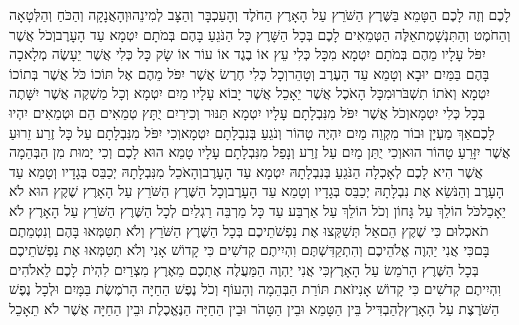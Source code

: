 \documentclass[../main/main.tex]{subfiles}
\begin{document}
\begin{multicols*}{\ncols}
לָכֶם \ClosedSection{}וְזֶה לָכֶם הַטָּמֵא בַּשֶּׁרֶץ הַשֹּׁרֵץ עַל הָאָרֶץ הַחֹלֶד וְהָעַכְבָּר וְהַצָּב לְמִינֵהוּ\PreVerseSpace{}וְהָאֲנָקָה וְהַכֹּחַ וְהַלְּטָאָה וְהַחֹמֶט וְהַתִּנְשָׁמֶת\PreVerseSpace{}אֵלֶּה הַטְּמֵאִים לָכֶם בְּכָל הַשָּׁרֶץ כָּל הַנֹּגֵעַ בָּהֶם בְּמֹתָם יִטְמָא עַד הָעָרֶב\PreVerseSpace{}וְכֹל אֲשֶׁר יִפֹּל עָלָיו מֵהֶם בְּמֹתָם יִטְמָא מִכָּל כְּלִי עֵץ אוֹ בֶגֶד אוֹ עוֹר אוֹ שָׂק כָּל כְּלִי אֲשֶׁר יֵעָשֶׂה מְלָאכָה בָּהֶם בַּמַּיִם יוּבָא וְטָמֵא עַד הָעֶרֶב וְטָהֵר\PreVerseSpace{}וְכָל כְּלִי חֶרֶשׂ אֲשֶׁר יִפֹּל מֵהֶם אֶל תּוֹכוֹ כֹּל אֲשֶׁר בְּתוֹכוֹ יִטְמָא וְאֹתוֹ תִשְׁבֹּרוּ\PreVerseSpace{}מִכָּל הָאֹכֶל אֲשֶׁר יֵאָכֵל אֲשֶׁר יָבוֹא עָלָיו מַיִם יִטְמָא וְכָל מַשְׁקֶה אֲשֶׁר יִשָּׁתֶה בְּכָל כְּלִי יִטְמָא\PreVerseSpace{}וְכֹל אֲשֶׁר יִפֹּל מִנִּבְלָתָם עָלָיו יִטְמָא תַּנּוּר וְכִירַיִם יֻתָּץ טְמֵאִים הֵם וּטְמֵאִים יִהְיוּ לָכֶם\PreVerseSpace{}אַךְ מַעְיָן וּבוֹר מִקְוֵה מַיִם יִהְיֶה טָהוֹר וְנֹגֵעַ בְּנִבְלָתָם יִטְמָא\PreVerseSpace{}וְכִי יִפֹּל מִנִּבְלָתָם עַל כָּל זֶרַע זֵרוּעַ אֲשֶׁר יִזָּרֵעַ טָהוֹר הוּא\PreVerseSpace{}וְכִי יֻתַּן מַיִם עַל זֶרַע וְנָפַל מִנִּבְלָתָם עָלָיו טָמֵא הוּא לָכֶם \ClosedSection{}וְכִי יָמוּת מִן הַבְּהֵמָה אֲשֶׁר הִיא לָכֶם לְאָכְלָה הַנֹּגֵעַ בְּנִבְלָתָהּ יִטְמָא עַד הָעָרֶב\PreVerseSpace{}וְהָאֹכֵל מִנִּבְלָתָהּ יְכַבֵּס בְּגָדָיו וְטָמֵא עַד הָעָרֶב וְהַנֹּשֵׂא אֶת נִבְלָתָהּ יְכַבֵּס בְּגָדָיו וְטָמֵא עַד הָעָרֶב\PreVerseSpace{}וְכָל הַשֶּׁרֶץ הַשֹּׁרֵץ עַל הָאָרֶץ שֶׁקֶץ הוּא לֹא יֵאָכֵל\PreVerseSpace{}כֹּל הוֹלֵךְ עַל גָּחוֹן וְכֹל הוֹלֵךְ עַל אַרְבַּע עַד כָּל מַרְבֵּה רַגְלַיִם לְכָל הַשֶּׁרֶץ הַשֹּׁרֵץ עַל הָאָרֶץ לֹא תֹאכְלוּם כִּי שֶׁקֶץ הֵם\PreVerseSpace{}אַל תְּשַׁקְּצוּ אֶת נַפְשֹׁתֵיכֶם בְּכָל הַשֶּׁרֶץ הַשֹּׁרֵץ וְלֹא תִטַּמְּאוּ בָּהֶם וְנִטְמֵתֶם בָּם\PreVerseSpace{}כִּי אֲנִי יַהְוֶה אֱלֹהֵיכֶם וְהִתְקַדִּשְׁתֶּם וִהְיִיתֶם קְדֹשִׁים כִּי קָדוֹשׁ אָנִי וְלֹא תְטַמְּאוּ אֶת נַפְשֹׁתֵיכֶם בְּכָל הַשֶּׁרֶץ הָרֹמֵשׂ עַל הָאָרֶץ\PreVerseSpace{}כִּי אֲנִי יַהְוֶה הַמַּעֲלֶה אֶתְכֶם מֵאֶרֶץ מִצְרַיִם לִהְיֹת לָכֶם לֵאלֹהִים וִהְיִיתֶם קְדֹשִׁים כִּי קָדוֹשׁ אָנִי\PreVerseSpace{}זֹאת תּוֹרַת הַבְּהֵמָה וְהָעוֹף וְכֹל נֶפֶשׁ הַחַיָּה הָרֹמֶשֶׂת בַּמָּיִם וּלְכָל נֶפֶשׁ הַשֹּׁרֶצֶת עַל הָאָרֶץ\PreVerseSpace{}לְהַבְדִּיל בֵּין הַטָּמֵא וּבֵין הַטָּהֹר וּבֵין הַחַיָּה הַנֶּאֱכֶלֶת וּבֵין הַחַיָּה אֲשֶׁר לֹא תֵאָכֵל\OpenSection{}\par

\end{multicols*}
\end{document}

